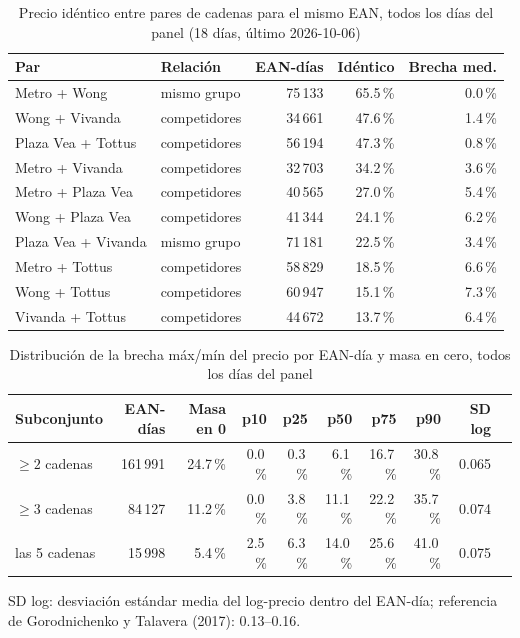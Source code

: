 
\begin{table}[htbp]
\caption{Precio id\'entico entre pares de cadenas para el mismo EAN, todos los d\'ias del panel (18 d\'ias, \'ultimo 2026-10-06)}
\label{tab:identidad}
\centering\scriptsize\setlength{\tabcolsep}{3pt}
\begin{tabular}{@{}llrrr@{}}
\toprule
Par & Relaci\'on & EAN-d\'ias & Id\'entico & Brecha med. \\
\midrule
Metro + Wong & mismo grupo & 75\,133 & 65.5\,\% & 0.0\,\% \\
Wong + Vivanda & competidores & 34\,661 & 47.6\,\% & 1.4\,\% \\
Plaza Vea + Tottus & competidores & 56\,194 & 47.3\,\% & 0.8\,\% \\
Metro + Vivanda & competidores & 32\,703 & 34.2\,\% & 3.6\,\% \\
Metro + Plaza Vea & competidores & 40\,565 & 27.0\,\% & 5.4\,\% \\
Wong + Plaza Vea & competidores & 41\,344 & 24.1\,\% & 6.2\,\% \\
Plaza Vea + Vivanda & mismo grupo & 71\,181 & 22.5\,\% & 3.4\,\% \\
Metro + Tottus & competidores & 58\,829 & 18.5\,\% & 6.6\,\% \\
Wong + Tottus & competidores & 60\,947 & 15.1\,\% & 7.3\,\% \\
Vivanda + Tottus & competidores & 44\,672 & 13.7\,\% & 6.4\,\% \\
\bottomrule\end{tabular}\end{table}

\begin{table}[t]
\caption{Distribuci\'on de la brecha m\'ax/m\'in del precio por EAN-d\'ia y masa en cero, todos los d\'ias del panel}
\label{tab:brecha}
\centering\scriptsize\setlength{\tabcolsep}{4pt}
\begin{tabular}{@{}lrrrrrrrrr@{}}
\toprule
Subconjunto & EAN-d\'ias & Masa en 0 & p10 & p25 & p50 & p75 & p90 & SD log \\
\midrule
$\geq 2$ cadenas & 161\,991 & 24.7\,\% & 0.0\,\% & 0.3\,\% & 6.1\,\% & 16.7\,\% & 30.8\,\% & 0.065 \\
$\geq 3$ cadenas & 84\,127 & 11.2\,\% & 0.0\,\% & 3.8\,\% & 11.1\,\% & 22.2\,\% & 35.7\,\% & 0.074 \\
las 5 cadenas & 15\,998 & 5.4\,\% & 2.5\,\% & 6.3\,\% & 14.0\,\% & 25.6\,\% & 41.0\,\% & 0.075 \\
\bottomrule\end{tabular}
\par\smallskip\raggedright\scriptsize SD log: desviaci\'on est\'andar media del log-precio dentro del EAN-d\'ia; referencia de Gorodnichenko y Talavera (2017): 0.13--0.16.
\end{table}

